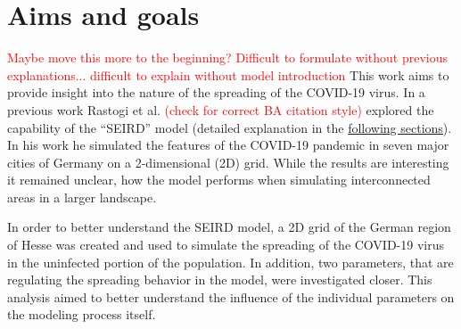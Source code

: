 \section{Aims and goals}
\textcolor{red}{Maybe move this more to the beginning? Difficult to formulate without previous explanations...}\newline %
\textcolor{red}{difficult to explain without model introduction}\newline %
This work aims to provide insight into the nature of the spreading of the COVID-19 virus. In a previous work Rastogi et al.\cite{rastogi}
\textcolor{red}{(check for correct BA citation style)} %
explored the capability of the ``SEIRD'' model\cite{wittum} (detailed explanation in the \hyperref[sec:SEIRD]{following sections}).
In his work he simulated the features of the COVID-19 pandemic in seven major cities of Germany on a 2-dimensional (2D) grid. While the
results are interesting it remained unclear, how the model performs when simulating interconnected areas in a larger landscape.\newline

\par
In order to better understand the SEIRD model, a 2D grid of the German region of Hesse was created and used to simulate the spreading of
the COVID-19 virus in the uninfected portion of the population. In addition, two parameters, that are regulating the spreading behavior
in the model, were investigated closer. This analysis aimed to better understand the influence of the individual parameters on the modeling
process itself.

